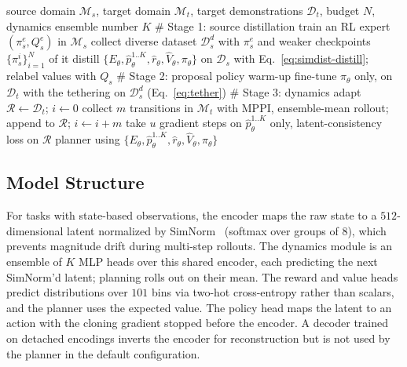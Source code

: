 \documentclass{article} %
\begin{document}
\begin{algorithm}[h]
\caption{DoaminADEPT}
\label{alg:simoaed}
\begin{algorithmic}[1]
\Require source domain $\mathcal{M}_s$, target domain $\mathcal{M}_t$,
         target demonstrations $\mathcal{D}_t$, budget $N$,
         dynamics ensemble number $K$
\Statex $\#$ Stage 1: source distillation
\State train an RL expert $(\pi_s^e, Q_s^e)$ in $\mathcal{M}_s$
\State collect diverse dataset $\mathcal{D}_s^d$ with $\pi_s^e$ and weaker checkpoints $\{\pi_s^i\}_{i=1}^N$ of it
\State distill $\{E_\theta, \hat p_\theta^{1..K}, \hat r_\theta, \hat V_\theta, \pi_\theta\}$
       on $\mathcal{D}_s$ with Eq.~\ref{eq:simdist-distill}; relabel values with $Q_s$
\Statex $\#$ Stage 2: proposal policy warm-up
\State fine-tune $\pi_\theta$ only, on $\mathcal{D}_t$ with the tethering on $\mathcal{D}_s^d$ (Eq.~\ref{eq:tether})
\Statex $\#$ Stage 3: dynamics adapt
\State $\mathcal{R} \gets \mathcal{D}_t$; \; $i \gets 0$
  \State collect $m$ transitions in $\mathcal{M}_t$ with MPPI, ensemble-mean rollout; append to $\mathcal{R}$; \; $i \gets i + m$
  \State take $u$ gradient steps on $\hat p_\theta^{1..K}$ only, latent-consistency
         loss on $\mathcal{R}$ 
\EndWhile
\State \Return planner using $\{E_\theta, \hat p_\theta^{1..K}, \hat r_\theta, \hat V_\theta, \pi_\theta\}$
\end{algorithmic}
\end{algorithm}

\subsection{Model Structure}

For tasks with state-based observations, the encoder maps the raw state to a $512$-dimensional latent normalized by SimNorm~\citep{hansen2024td} (softmax over groups of $8$), which prevents magnitude drift during multi-step rollouts. The dynamics module is an ensemble of $K$ MLP heads over this shared encoder, each predicting the next SimNorm'd latent; planning rolls out on their mean. The reward and value heads predict distributions over $101$ bins via two-hot cross-entropy rather than scalars, and the planner uses the expected value. The policy head maps the latent to an action with the cloning gradient stopped before the encoder. A decoder trained on detached encodings inverts the encoder for reconstruction but is not used by the planner in the default configuration.
\end{document}
